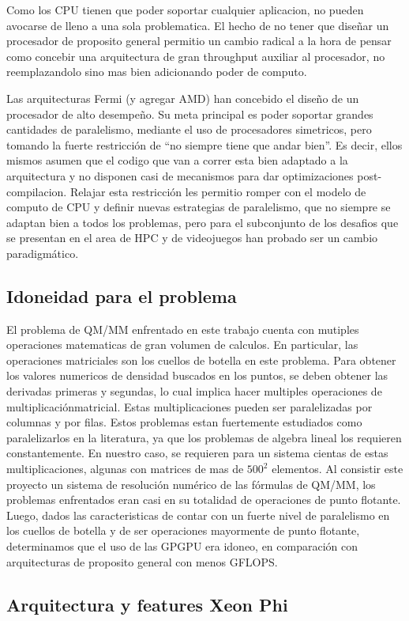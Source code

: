 Como los CPU tienen que poder soportar cualquier aplicacion, no pueden avocarse de lleno a una sola
problematica. El hecho de no tener que dise\~nar un procesador de proposito general permitio un cambio radical
a la hora de pensar como concebir una arquitectura de gran throughput auxiliar al procesador, no reemplazandolo
sino mas bien adicionando poder de computo.~\cite{GlaskowskyFermi}

Las arquitecturas Fermi (y agregar AMD) han concebido el dise\~no de un procesador de alto desempe\~no.
Su meta principal es poder soportar grandes cantidades de paralelismo, mediante el uso de procesadores
simetricos, pero tomando la fuerte restricci\'on de ``no siempre tiene que andar bien''. Es decir, ellos
mismos asumen que el codigo que van a correr esta bien adaptado a la arquitectura y no disponen
casi de mecanismos para dar optimizaciones post-compilacion. Relajar esta restricci\'on
les permitio romper con el modelo de computo de CPU y definir nuevas estrategias de paralelismo,
que no siempre se adaptan bien a todos los problemas, pero para el subconjunto de los desafios que se
presentan en el area de HPC y de videojuegos han probado ser un cambio paradigm\'atico.

\subsection{Idoneidad para el problema}
El problema de QM/MM enfrentado en este trabajo cuenta con mutiples operaciones matematicas de gran
volumen de calculos. En particular, las operaciones matriciales son los cuellos de botella en este
problema.
Para obtener los valores numericos de densidad buscados en los puntos, se deben obtener las derivadas primeras
y segundas, lo cual implica hacer multiples operaciones de multiplicaci\'onmatricial. Estas multiplicaciones
pueden ser paralelizadas por columnas y por filas. Estos problemas estan fuertemente estudiados como paralelizarlos
en la literatura, ya que los problemas de algebra lineal los requieren constantemente.
En nuestro caso, se requieren para un sistema cientas de estas multiplicaciones, algunas con matrices de mas de
$500^2$ elementos. Al consistir este proyecto un sistema de resoluci\'on num\'erico de las f\'ormulas de QM/MM,
los problemas enfrentados eran casi en su totalidad de operaciones de punto flotante. Luego, dados las
caracteristicas de contar con un fuerte nivel de paralelismo en los cuellos de botella y de ser operaciones
mayormente de punto flotante, determinamos que el uso de las GPGPU era idoneo, en comparaci\'on con arquitecturas
de proposito general con menos GFLOPS.

\subsection{Arquitectura y features Xeon Phi}


